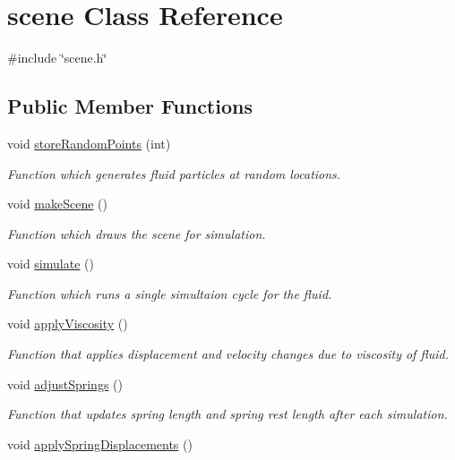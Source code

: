 \hypertarget{classscene}{}\section{scene Class Reference}
\label{classscene}


{\ttfamily \#include \char`\"{}scene.\+h\char`\"{}}

\subsection*{Public Member Functions}
\begin{DoxyCompactItemize}
\item 
void \hyperlink{classscene_ada443dbbf28ef6094bd4fe15f1db5b17}{store\+Random\+Points} (int)
\begin{DoxyCompactList}\small\item\em Function which generates fluid particles at random locations. \end{DoxyCompactList}\item 
void \hyperlink{classscene_a91f9f8fd971538eb19ff1877e50746f8}{make\+Scene} ()
\begin{DoxyCompactList}\small\item\em Function which draws the scene for simulation. \end{DoxyCompactList}\item 
void \hyperlink{classscene_a3ff4def77367913f3e972d709676269b}{simulate} ()
\begin{DoxyCompactList}\small\item\em Function which runs a single simultaion cycle for the fluid. \end{DoxyCompactList}\item 
void \hyperlink{classscene_a7595aeca99db7ac7e6d2c6b1bfe0b0f9}{apply\+Viscosity} ()
\begin{DoxyCompactList}\small\item\em Function that applies displacement and velocity changes due to viscosity of fluid. \end{DoxyCompactList}\item 
void \hyperlink{classscene_a6f4e28c2ad9fc020475e837ae931166b}{adjust\+Springs} ()
\begin{DoxyCompactList}\small\item\em Function that updates spring length and spring rest length after each simulation. \end{DoxyCompactList}\item 
void \hyperlink{classscene_a17b6f5ee5354a688db7506f68d77623e}{apply\+Spring\+Displacements} ()

\end{DoxyCompactItemize}
